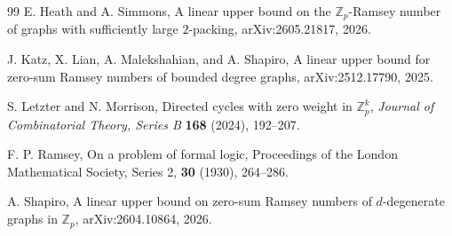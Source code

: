 ﻿\documentclass[11pt]{article}
\numberwithin{equation}{section}
\theoremstyle{remark}
\begin{document}
\begin{thebibliography}{99}
    E. Heath and A. Simmons,
    \newblock A linear upper bound on the \(\mathbb Z_p\)-Ramsey number of graphs with sufficiently large \(2\)-packing,
    \newblock arXiv:2605.21817, 2026.

    J. Katz, X. Lian, A. Malekshahian, and A. Shapiro,
    \newblock A linear upper bound for zero-sum Ramsey numbers of bounded degree graphs,
    \newblock arXiv:2512.17790, 2025.

    S. Letzter and N. Morrison,
    \newblock Directed cycles with zero weight in \(\mathbb Z_p^k\),
    \newblock \emph{Journal of Combinatorial Theory, Series B} \textbf{168}
    (2024), 192--207.

    F. P. Ramsey,
    \newblock On a problem of formal logic,
    \newblock Proceedings of the London Mathematical Society, Series 2, \textbf{30} (1930), 264--286.

    A. Shapiro,
    \newblock A linear upper bound on zero-sum Ramsey numbers of \(d\)-degenerate graphs in \(\mathbb Z_p\),
    \newblock arXiv:2604.10864, 2026.

\end{thebibliography}
\end{document}
